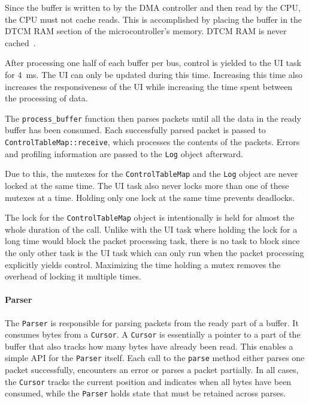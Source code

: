 Since the buffer is written to by the DMA controller and then read by the CPU, the CPU must not cache
reads. This is accomplished by placing the buffer in the DTCM RAM section of the microcontroller's
memory. DTCM RAM is never cached~\cite{mcu-ref-manual}.

After processing one half of each buffer per bus, control is yielded to the UI task for \SI{4}{\milli\second}.
The UI can only be updated during this time. Increasing this time also increases the responsiveness
of the UI while increasing the time spent between the processing of data.

The \lstinline{process_buffer} function then parses packets until all the data in the ready buffer
has been consumed. Each successfully parsed packet is passed to \lstinline{ControlTableMap::receive},
which processes the contents of the packets. Errors and profiling information are passed to the
\lstinline{Log} object afterward.

Due to this, the mutexes for the \lstinline{ControlTableMap} and the \lstinline{Log} object are
never locked at the same time. The UI task also never locks more than one of these mutexes at a time.
Holding only one lock at the same time prevents deadlocks.

The lock for the \lstinline{ControlTableMap} object is intentionally is held for almost the whole
duration of the call. Unlike with the UI task where holding the lock for a long time would block
the packet processing task, there is no task to block since the only other task is the UI task which
can only run when the packet processing explicitly yields control. Maximizing the time holding a
mutex removes the overhead of locking it multiple times.

\paragraph{Parser}

The \lstinline{Parser} is responsible for parsing packets from the ready part of a buffer. It
consumes bytes from a \mbox{\lstinline{Cursor}.} A \lstinline{Cursor} is essentially a pointer to
a part of the buffer that also tracks how many bytes have already been read. This enables a simple
API for the \lstinline{Parser} itself. Each call to the \lstinline{parse} method either parses one
packet successfully, encounters an error or parses a packet partially. In all cases, the \lstinline{Cursor}
tracks the current position and indicates when all bytes have been consumed, while the \lstinline{Parser}
holds state that must be retained across parses.


